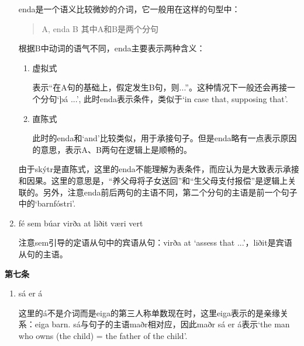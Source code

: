 \begin{grammar*}{}
\begin{enumerate}
              enda是一个语义比较微妙的介词，它一般用在这样的句型中：
              \begin{quote}
                  A, enda B  其中A和B是两个分句
              \end{quote}
              根据B中动词的语气不同，enda主要表示两种含义：
              \begin{enumerate}
                  \item  虚拟式

                        表示“在A句的基础上，假定发生B句，则...”。这种情况下一般还会再接一个分句`þá ...', 此时enda表示条件，类似于`in case that, supposing that'.

                  \item 直陈式

                        此时的enda和`and'比较类似，用于承接句子。但是enda略有一点表示原因的意思，表示A、B两句在逻辑上是顺畅的。
              \end{enumerate}
              由于skýtr是直陈式，这里的enda不能理解为表条件，而应认为是大致表示承接和因果。这里的意思是，“养父母将子女送回”和“生父母支付报偿”是逻辑上关联的。另外，注意enda前后两句的主语不同，第二个分句的主语是前一个句子中的`barnfóstri'.

        \item fé sem búar virða at liðit væri vert

              注意sem引导的定语从句中的宾语从句：virða at `assess that ...'，liðit是宾语从句的主语。
    \end{enumerate}
    \textbf{第七条}
    \begin{enumerate}
        \item sá er á

              这里的á不是介词而是eiga的第三人称单数现在时，这里eiga表示的是亲缘关系：eiga barn. sá与句子的主语maðr相对应，因此maðr sá er á表示`the man who owns (the child) = the father of the child'.
    \end{enumerate}
\end{grammar*}